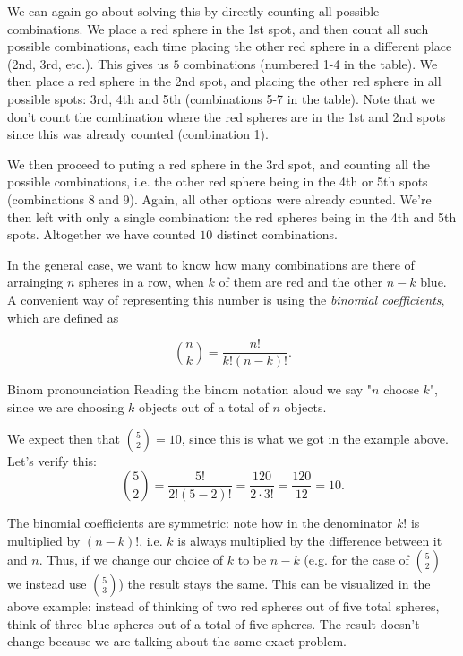 We can again go about solving this by directly counting all possible combinations. We place a red sphere in the 1st spot, and then count all such possible combinations, each time placing the other red sphere in a different place (2nd, 3rd, etc.). This gives us $5$ combinations (numbered 1-4 in the table). We then place a red sphere in the 2nd spot, and placing the other red sphere in all possible spots: 3rd, 4th and 5th (combinations 5-7 in the table). Note that we don't count the combination where the red spheres are in the 1st and 2nd spots since this was already counted (combination 1).

We then proceed to puting a red sphere in the 3rd spot, and counting all the possible combinations, i.e. the other red sphere being in the 4th or 5th spots (combinations 8 and 9). Again, all other options were already counted. We're then left with only a single combination: the red spheres being in the 4th and 5th spots. Altogether we have counted $10$ distinct combinations.

In the general case, we want to know how many combinations are there of arrainging $n$ spheres in a row, when $k$ of them are red and the other $n-k$ blue. A convenient way of representing this number is using the \emph{binomial coefficients}, which are defined as

\begin{equation}
	\binom{n}{k} = \frac{n!}{k!(n-k)!}.
	\label{eq:binom_def}
\end{equation}

\begin{note}{Binom pronounciation}{}
	Reading the binom notation aloud we say "$n$ choose $k$", since we are choosing $k$ objects out of a total of $n$ objects.
\end{note}

We expect then that $\binom{5}{2}=10$, since this is what we got in the example above. Let's verify this:
\[
	\binom{5}{2} = \frac{5!}{2!(5-2)!} = \frac{120}{2\cdot3!} = \frac{120}{12} = 10.
\]

The binomial coefficients are symmetric: note how in the denominator $k!$ is multiplied by $(n-k)!$, i.e. $k$ is always multiplied by the difference between it and $n$. Thus, if we change our choice of $k$ to be $n-k$ (e.g. for the case of $\binom{5}{2}$ we instead use $\binom{5}{3}$) the result stays the same. This can be visualized in the above example: instead of thinking of two red spheres out of five total spheres, think of three blue spheres out of a total of five spheres. The result doesn't change because we are talking about the same exact problem.

